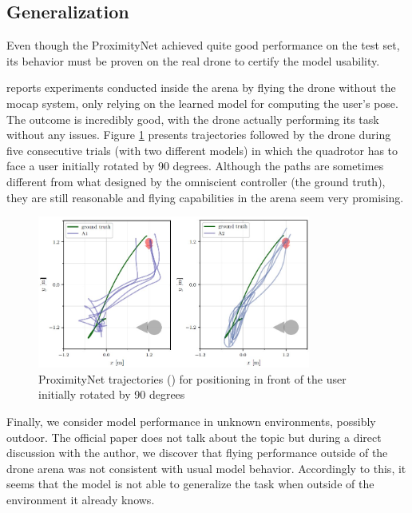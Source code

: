 \subsection{Generalization}
\label{subsec:proximitynet-generalization}

Even though the ProximityNet achieved quite good performance on the test set, its behavior must be proven on the real drone to certify the model usability.

\cite{mantegazza2019visionbased} reports experiments conducted inside the arena by flying the drone without the \gls{mocap} system, only relying on the learned model for computing the user's pose. The outcome is incredibly good, with the drone actually performing its task without any issues. Figure \ref{fig:proximitynet-trajectories} presents trajectories followed by the drone during five consecutive trials (with two different models) in which the quadrotor has to face a user initially rotated by 90 degrees. Although the paths are sometimes different from what designed by the omniscient controller (the ground truth), they are still reasonable and flying capabilities in the arena seem very promising.

\begin{figure}[!htb]
	\centering
	\includegraphics[width=0.8\textwidth]{"contents/images/03-proximitynet-trajectories"}
	\caption[ProximityNet trajectories (\cite{mantegazza2019visionbased}) for positioning in front of the user initially rotated by 90 degrees]{ProximityNet trajectories (\cite{mantegazza2019visionbased}) for positioning in front of the user initially rotated by 90 degrees}
	\label{fig:proximitynet-trajectories}
\end{figure}

\medskip

Finally, we consider model performance in unknown environments, possibly outdoor. The official paper does not talk about the topic but during a direct discussion with the author, we discover that flying performance outside of the drone arena was not consistent with usual model behavior. Accordingly to this, it seems that the model is not able to generalize the task when outside of the environment it already knows.

